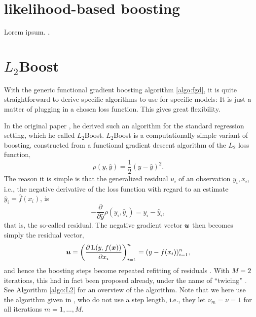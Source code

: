 \section{likelihood-based boosting}
Lorem ipsum. \citep{DeBin2016} \citep{gamboost}.

\section{$L_2$Boost}
With the generic functional gradient boosting algorithm \eqref{algo:fgd}, it is quite straightforward to derive specific algorithms to use for specific models: It is just a matter of plugging in a chosen loss function. This gives great flexibility.

In the original paper \citep{friedman2001}, he derived such an algorithm for the standard regression setting, which he called $L_2$Boost. $L_2$Boost is a computationally simple variant of boosting, constructed from a functional gradient descent algorithm of the $L_2$ loss function,
\begin{equation*}
    \rho(y, \hat{y})=\frac{1}{2}(y-\hat{y})^2.
\end{equation*}
The reason it is simple is that the generalized residual $u_i$ of an observation $y_i,x_i$, i.e., the negative derivative of the loss function with regard to an estimate $\hat{y}_i=\hat{f}(x_i)$, is
\begin{equation*}
    -\frac{\partial}{\partial\hat{y}}\rho(y_i, \hat{y}_i)=y_i-\hat{y}_i,
\end{equation*}
that is, the so-called residual. The negative gradient vector $\bm{u}$ then becomes simply the residual vector,
\begin{equation*}
    \bm{u}=\left(\frac{\partial\operatorname{L}(y,f(\bm{x}))}{\partial x_i}\right)_{i=1}^n=(y-f(x_i))_{i=1}^n,
\end{equation*}
and hence the boosting steps become repeated refitting of residuals \citep{friedman2001,buhlmann-yu}. With $M=2$ iterations, this had in fact been proposed already, under the name of ``twicing'' \citep{tukey}. See Algorithm \ref{algo:L2} for an overview of the algorithm. Note that we here use the algorithm given in \citet{buhlmann-yu}, who do not use a step length, i.e., they let $\nu_m=\nu=1$ for all iterations $m=1,\ldots,M$.
